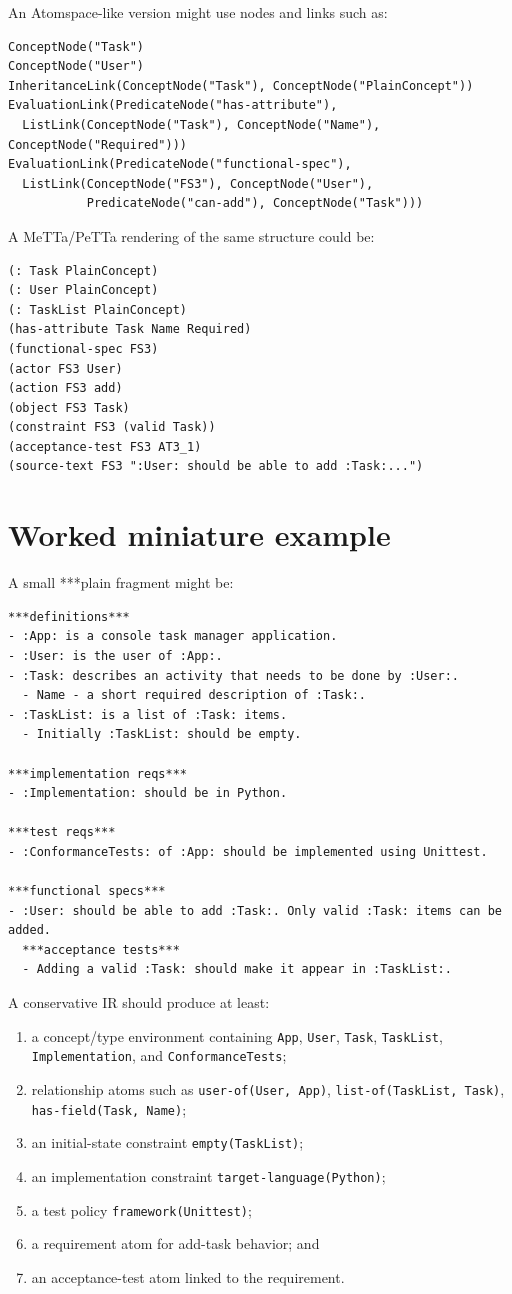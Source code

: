 \documentclass[11pt]{article}
\begin{document}
An Atomspace-like version might use nodes and links such as:
\begin{verbatim}
ConceptNode("Task")
ConceptNode("User")
InheritanceLink(ConceptNode("Task"), ConceptNode("PlainConcept"))
EvaluationLink(PredicateNode("has-attribute"),
  ListLink(ConceptNode("Task"), ConceptNode("Name"), ConceptNode("Required")))
EvaluationLink(PredicateNode("functional-spec"),
  ListLink(ConceptNode("FS3"), ConceptNode("User"),
           PredicateNode("can-add"), ConceptNode("Task")))
\end{verbatim}

A MeTTa/PeTTa rendering of the same structure could be:
\begin{verbatim}
(: Task PlainConcept)
(: User PlainConcept)
(: TaskList PlainConcept)
(has-attribute Task Name Required)
(functional-spec FS3)
(actor FS3 User)
(action FS3 add)
(object FS3 Task)
(constraint FS3 (valid Task))
(acceptance-test FS3 AT3_1)
(source-text FS3 ":User: should be able to add :Task:...")
\end{verbatim}

\section{Worked miniature example}

A small ***plain fragment might be:
\begin{verbatim}
***definitions***
- :App: is a console task manager application.
- :User: is the user of :App:.
- :Task: describes an activity that needs to be done by :User:.
  - Name - a short required description of :Task:.
- :TaskList: is a list of :Task: items.
  - Initially :TaskList: should be empty.

***implementation reqs***
- :Implementation: should be in Python.

***test reqs***
- :ConformanceTests: of :App: should be implemented using Unittest.

***functional specs***
- :User: should be able to add :Task:. Only valid :Task: items can be added.
  ***acceptance tests***
  - Adding a valid :Task: should make it appear in :TaskList:.
\end{verbatim}

A conservative IR should produce at least:
\begin{enumerate}
  \item a concept/type environment containing \texttt{App}, \texttt{User},
        \texttt{Task}, \texttt{TaskList}, \texttt{Implementation}, and
        \texttt{ConformanceTests};
  \item relationship atoms such as \texttt{user-of(User, App)},
        \texttt{list-of(TaskList, Task)}, \texttt{has-field(Task, Name)};
  \item an initial-state constraint \texttt{empty(TaskList)};
  \item an implementation constraint \texttt{target-language(Python)};
  \item a test policy \texttt{framework(Unittest)};
  \item a requirement atom for add-task behavior; and
  \item an acceptance-test atom linked to the requirement.
\end{enumerate}
\end{document}
